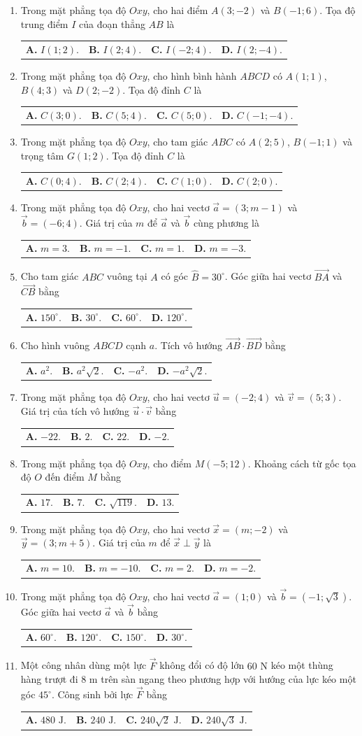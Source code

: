 \documentclass[10pt,a4paper]{article}
\makeatletter
\newcommand{\four}[4]{\par\noindent\begin{tabularx}{\linewidth}{@{}*{4}{>{\raggedright\arraybackslash}X}@{}}\textbf{A.} #1&\textbf{B.} #2&\textbf{C.} #3&\textbf{D.} #4\end{tabularx}}
\makeatother
\begin{document}
\begin{enumerate}
\item Trong mặt phẳng tọa độ $Oxy$, cho hai điểm $A(3; -2)$ và $B(-1; 6)$. Tọa độ trung điểm $I$ của đoạn thẳng $AB$ là
\four{$I(1; 2)$.}{$I(2; 4)$.}{$I(-2; 4)$.}{$I(2; -4)$.}

\item Trong mặt phẳng tọa độ $Oxy$, cho hình bình hành $ABCD$ có $A(1; 1)$, $B(4; 3)$ và $D(2; -2)$. Tọa độ đỉnh $C$ là
\four{$C(3; 0)$.}{$C(5; 4)$.}{$C(5; 0)$.}{$C(-1; -4)$.}

\item Trong mặt phẳng tọa độ $Oxy$, cho tam giác $ABC$ có $A(2; 5)$, $B(-1; 1)$ và trọng tâm $G(1; 2)$. Tọa độ đỉnh $C$ là
\four{$C(0; 4)$.}{$C(2; 4)$.}{$C(1; 0)$.}{$C(2; 0)$.}
\pagebreak

\item Trong mặt phẳng tọa độ $Oxy$, cho hai vectơ $\vec{a} = (3; m - 1)$ và $\vec{b} = (-6; 4)$. Giá trị của $m$ để $\vec{a}$ và $\vec{b}$ cùng phương là
\four{$m = 3$.}{$m = -1$.}{$m = 1$.}{$m = -3$.}

\item Cho tam giác $ABC$ vuông tại $A$ có góc $\widehat{B} = 30^\circ$. Góc giữa hai vectơ $\vec{BA}$ và $\vec{CB}$ bằng
\four{$150^\circ$.}{$30^\circ$.}{$60^\circ$.}{$120^\circ$.}

\item Cho hình vuông $ABCD$ cạnh $a$. Tích vô hướng $\vec{AB} \cdot \vec{BD}$ bằng
\four{$a^2$.}{$a^2\sqrt{2}$.}{$-a^2$.}{$-a^2\sqrt{2}$.}

\item Trong mặt phẳng tọa độ $Oxy$, cho hai vectơ $\vec{u} = (-2; 4)$ và $\vec{v} = (5; 3)$. Giá trị của tích vô hướng $\vec{u} \cdot \vec{v}$ bằng
\four{$-22$.}{$2$.}{$22$.}{$-2$.}

\item Trong mặt phẳng tọa độ $Oxy$, cho điểm $M(-5; 12)$. Khoảng cách từ gốc tọa độ $O$ đến điểm $M$ bằng
\four{$17$.}{$7$.}{$\sqrt{119}$.}{$13$.}

\item Trong mặt phẳng tọa độ $Oxy$, cho hai vectơ $\vec{x} = (m; -2)$ và $\vec{y} = (3; m + 5)$. Giá trị của $m$ để $\vec{x} \perp \vec{y}$ là
\four{$m = 10$.}{$m = -10$.}{$m = 2$.}{$m = -2$.}

\item Trong mặt phẳng tọa độ $Oxy$, cho hai vectơ $\vec{a} = (1; 0)$ và $\vec{b} = (-1; \sqrt{3})$. Góc giữa hai vectơ $\vec{a}$ và $\vec{b}$ bằng
\four{$60^\circ$.}{$120^\circ$.}{$150^\circ$.}{$30^\circ$.}

\item Một công nhân dùng một lực $\vec{F}$ không đổi có độ lớn $60\text{ N}$ kéo một thùng hàng trượt đi $8\text{ m}$ trên sàn ngang theo phương hợp với hướng của lực kéo một góc $45^\circ$. Công sinh bởi lực $\vec{F}$ bằng
\four{$480\text{ J}$.}{$240\text{ J}$.}{$240\sqrt{2}\text{ J}$.}{$240\sqrt{3}\text{ J}$.}
\end{enumerate}
\end{document}
